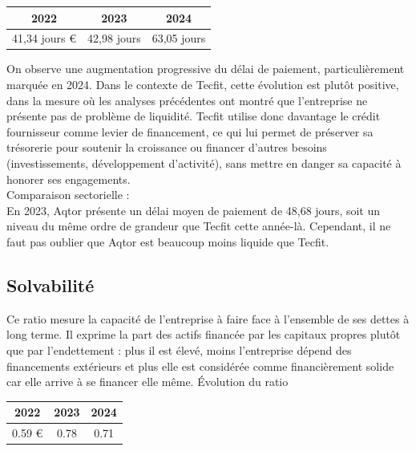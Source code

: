 \begin{table}[h]
\centering
\begin{tabular}{c|c|c}
\textbf{2022} & \textbf{2023} & \textbf{2024} \\
\hline
41,34 jours € & 42,98 jours & 63,05 jours \\
\end{tabular}
\end{table}
On observe une augmentation progressive du délai de paiement, particulièrement marquée en 2024. Dans le contexte de Tecfit, cette évolution est plutôt positive, dans la mesure où les analyses précédentes ont montré que l’entreprise ne présente pas de problème de liquidité. Tecfit utilise donc davantage le crédit fournisseur comme levier de financement, ce qui lui permet de préserver sa trésorerie pour soutenir la croissance ou financer d’autres besoins (investissements, développement d’activité), sans mettre en danger sa capacité à honorer ses engagements.\\
Comparaison sectorielle :\\
En 2023, Aqtor présente un délai moyen de paiement de 48,68 jours, soit un niveau du même ordre de grandeur que Tecfit cette année-là. Cependant, il ne faut pas oublier que Aqtor est beaucoup moins liquide que Tecfit.

\subsection{Solvabilité}
Ce ratio mesure la capacité de l’entreprise à faire face à l’ensemble de ses dettes à long terme. Il exprime la part des actifs financée par les capitaux propres plutôt que par l’endettement : plus il est élevé, moins l’entreprise dépend des financements extérieurs et plus elle est considérée comme financièrement solide car elle arrive à se financer elle même.
Évolution du ratio\\
\begin{table}[h]
\centering
\begin{tabular}{c|c|c}
\textbf{2022} & \textbf{2023} & \textbf{2024} \\
\hline
0.59 € & 0.78 & 0.71 \\
\end{tabular}
\end{table}

